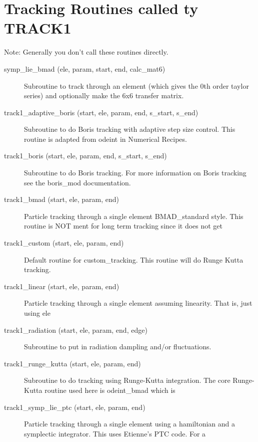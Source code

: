 \section{Tracking Routines called ty TRACK1}
\label{r:track1}   

Note: Generally you don't call these routines directly.

\begin{description}

\item[symp\_lie\_bmad (ele, param, start, end, calc\_mat6)] \Newline
Subroutine to track through an element (which gives the 0th order taylor 
series) and optionally make the 6x6 transfer matrix. 

\item[track1\_adaptive\_boris (start, ele, param, end, s\_start, s\_end)] \Newline
Subroutine to do Boris tracking with adaptive step size control. 
This routine is adapted from odeint in Numerical Recipes. 

\item[track1\_boris (start, ele, param, end, s\_start, s\_end)] \Newline
Subroutine to do Boris tracking. For more information on Boris tracking 
see the boris\_mod documentation. 

\item[track1\_bmad (start, ele, param, end)] \Newline
Particle tracking through a single element BMAD\_standard style. This 
routine is NOT ment for long term tracking since it does not get 

\item[track1\_custom (start, ele, param, end)] \Newline
Default routine for custom\_tracking. This routine will do Runge Kutta tracking. 

\item[track1\_linear (start, ele, param, end)] \Newline
Particle tracking through a single element assuming linearity. That is, 
just using ele%

\item[track1\_radiation (start, ele, param, end, edge)] \Newline
Subroutine to put in radiation dampling and/or fluctuations. 

\item[track1\_runge\_kutta (start, ele, param, end)] \Newline
Subroutine to do tracking using Runge-Kutta integration. The core 
Runge-Kutta routine used here is odeint\_bmad which is 

\item[track1\_symp\_lie\_ptc (start, ele, param, end)] \Newline
Particle tracking through a single element using a hamiltonian and a 
symplectic integrator. This uses Etienne's PTC code. For a 


\end{description}
